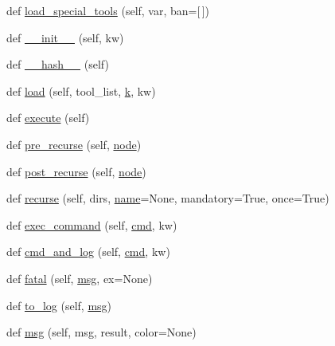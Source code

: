 \begin{DoxyCompactItemize}
\item 
def \hyperlink{classwaflib_1_1_context_1_1_context_a95a53e6c363450df77f847bec6c56696}{load\+\_\+special\+\_\+tools} (self, var, ban=\mbox{[}$\,$\mbox{]})
\item 
def \hyperlink{classwaflib_1_1_context_1_1_context_ab8fabf802b21a8a8e77c3e3811c58c84}{\+\_\+\+\_\+init\+\_\+\+\_\+} (self, kw)
\item 
def \hyperlink{classwaflib_1_1_context_1_1_context_ae8096e428213ed965d8cd5629c2481a1}{\+\_\+\+\_\+hash\+\_\+\+\_\+} (self)
\item 
def \hyperlink{classwaflib_1_1_context_1_1_context_ad214db6a7b3ce05051972f7d073a74f2}{load} (self, tool\+\_\+list, \hyperlink{rfft2d_test_m_l_8m_adc468c70fb574ebd07287b38d0d0676d}{k}, kw)
\item 
def \hyperlink{classwaflib_1_1_context_1_1_context_ae98aa77cb954743799c5b730c6775329}{execute} (self)
\item 
def \hyperlink{classwaflib_1_1_context_1_1_context_a290c81ad18ad9b3c0bcbde2d8fce519e}{pre\+\_\+recurse} (self, \hyperlink{structnode}{node})
\item 
def \hyperlink{classwaflib_1_1_context_1_1_context_ab818cd610ecc0c6fa981f0cde9f3dd13}{post\+\_\+recurse} (self, \hyperlink{structnode}{node})
\item 
def \hyperlink{classwaflib_1_1_context_1_1_context_a10e3b0d5e63bb03a0a7adbb32c3dceab}{recurse} (self, dirs, \hyperlink{lib_2expat_8h_a1b49b495b59f9e73205b69ad1a2965b0}{name}=None, mandatory=True, once=True)
\item 
def \hyperlink{classwaflib_1_1_context_1_1_context_aaa7d209a0d05f2f8e45fc11b83c72dba}{exec\+\_\+command} (self, \hyperlink{sndfile__play_8m_adfc5ba7e22f5e4a6221c12a70503bef3}{cmd}, kw)
\item 
def \hyperlink{classwaflib_1_1_context_1_1_context_aaa63c5a7ac60f1bf164febe6642d270f}{cmd\+\_\+and\+\_\+log} (self, \hyperlink{sndfile__play_8m_adfc5ba7e22f5e4a6221c12a70503bef3}{cmd}, kw)
\item 
def \hyperlink{classwaflib_1_1_context_1_1_context_a42739307965d7ef470985d7bb7408788}{fatal} (self, \hyperlink{classwaflib_1_1_context_1_1_context_a7495a2e04e528aa54bda3cadf08240cb}{msg}, ex=None)
\item 
def \hyperlink{classwaflib_1_1_context_1_1_context_a596fa2d8dc5a61602101f43ec1eb3e7e}{to\+\_\+log} (self, \hyperlink{classwaflib_1_1_context_1_1_context_a7495a2e04e528aa54bda3cadf08240cb}{msg})
\item 
def \hyperlink{classwaflib_1_1_context_1_1_context_a7495a2e04e528aa54bda3cadf08240cb}{msg} (self, msg, result, color=None)

\end{DoxyCompactItemize}
